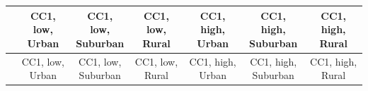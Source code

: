 
\begin{center}
\begin{small}
\begin{longtable}{l@{} c@{} c@{} c@{} c@{} c@{} c@{}}
\hline
 & \shortstack{\rule{0pt}{2.2ex}\hspace{0.25cm}CC1, low,\hspace{0.25cm}\\Urban} & \shortstack{\rule{0pt}{2.2ex}\hspace{0.25cm}CC1, low,\hspace{0.25cm}\\Suburban} & \shortstack{\rule{0pt}{2.2ex}\hspace{0.25cm}CC1, low,\hspace{0.25cm}\\Rural} & \shortstack{\rule{0pt}{2.2ex}\hspace{0.25cm}CC1, high,\hspace{0.25cm}\\Urban} & \shortstack{\rule{0pt}{2.2ex}\hspace{0.25cm}CC1, high,\hspace{0.25cm}\\Suburban} & \shortstack{\rule{0pt}{2.2ex}\hspace{0.25cm}CC1, high,\hspace{0.25cm}\\Rural} \\
\hline
\endfirsthead
\hline
 & \shortstack{\rule{0pt}{2.2ex}\hspace{0.25cm}CC1, low,\hspace{0.25cm}\\Urban} & \shortstack{\rule{0pt}{2.2ex}\hspace{0.25cm}CC1, low,\hspace{0.25cm}\\Suburban} & \shortstack{\rule{0pt}{2.2ex}\hspace{0.25cm}CC1, low,\hspace{0.25cm}\\Rural} & \shortstack{\rule{0pt}{2.2ex}\hspace{0.25cm}CC1, high,\hspace{0.25cm}\\Urban} & \shortstack{\rule{0pt}{2.2ex}\hspace{0.25cm}CC1, high,\hspace{0.25cm}\\Suburban} & \shortstack{\rule{0pt}{2.2ex}\hspace{0.25cm}CC1, high,\hspace{0.25cm}\\Rural} \\

\end{longtable}
\end{small}
\end{center}
